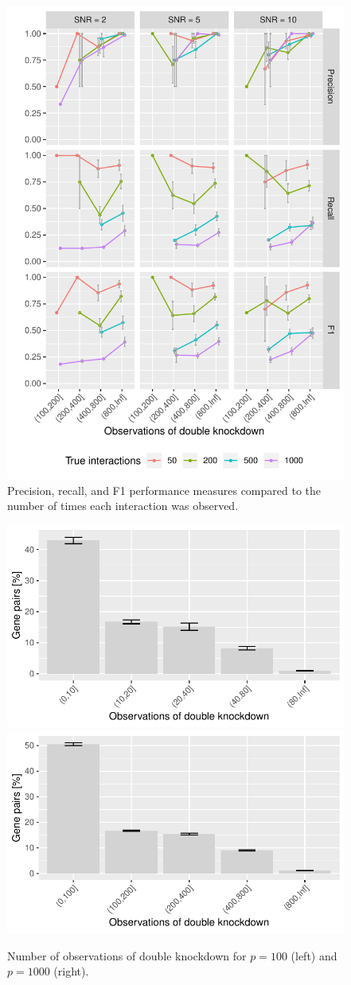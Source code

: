 \begin{figure}
\begin{minipage}{\linewidth}
	\includegraphics[width=0.5\linewidth]{"output/NumObservations_n10000_tyes"}
\end{minipage}
\caption{Precision, recall, and F1 performance measures compared to the number of times each interaction was observed.}
\end{figure}

\begin{figure}
	\begin{minipage}{\linewidth}
		\centering
		\includegraphics[width=0.5\linewidth]{"output/NumObservations_n1000_percGenes"}%
		\includegraphics[width=0.5\linewidth]{"output/NumObservations_n10000_percGenes"}
	\end{minipage}
	\caption{Number of observations of double knockdown for $p = 100$ (left) and $p = 1000$ (right).}
\end{figure}


